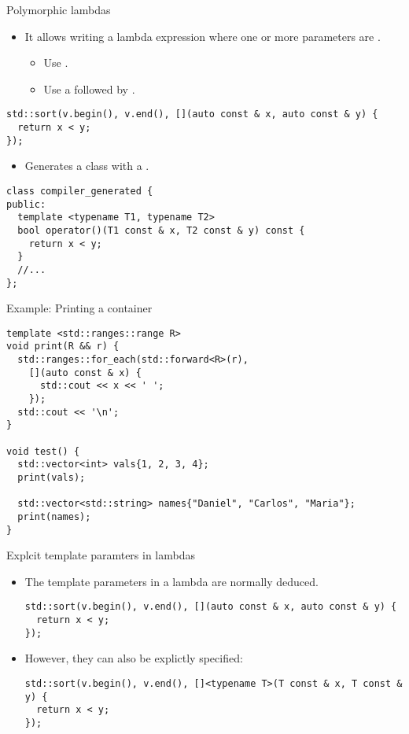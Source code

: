 \begin{frame}[t,fragile]{Polymorphic lambdas}
\begin{itemize}
  \item It allows writing a lambda expression where one or more parameters are .
    \begin{itemize}
      \item Use .
      \item Use a  followed by .
    \end{itemize}
\end{itemize}
\pause
\begin{lstlisting}
std::sort(v.begin(), v.end(), [](auto const & x, auto const & y) {
  return x < y;
});
\end{lstlisting}

\begin{itemize}
  \item Generates a class with a  .
\end{itemize}
\begin{lstlisting}
class compiler_generated {
public:
  template <typename T1, typename T2>
  bool operator()(T1 const & x, T2 const & y) const {
    return x < y;
  }
  //...
};
\end{lstlisting}
\end{frame}


\begin{frame}[t,fragile]{Example: Printing a container}
\begin{lstlisting}
template <std::ranges::range R>
void print(R && r) {
  std::ranges::for_each(std::forward<R>(r),
    [](auto const & x) {
      std::cout << x << ' ';
    });
  std::cout << '\n';
}

void test() {
  std::vector<int> vals{1, 2, 3, 4};
  print(vals);

  std::vector<std::string> names{"Daniel", "Carlos", "Maria"};
  print(names);
}
\end{lstlisting}
\end{frame}
\begin{frame}[t,fragile]{Explcit template paramters in lambdas}
\begin{itemize}
  \item The template parameters in a lambda are normally deduced.
\begin{lstlisting}
std::sort(v.begin(), v.end(), [](auto const & x, auto const & y) {
  return x < y;
});
\end{lstlisting}

  \item However, they can also be explictly specified:
\begin{lstlisting}
std::sort(v.begin(), v.end(), []<typename T>(T const & x, T const & y) {
  return x < y;
});
\end{lstlisting}
\end{itemize}
\end{frame}

